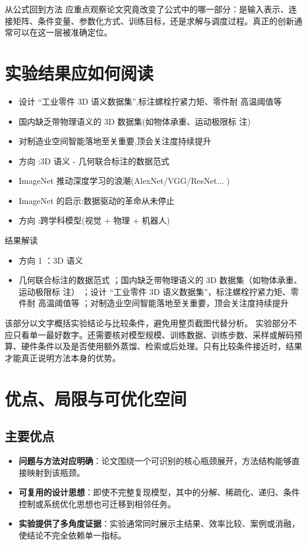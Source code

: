 \documentclass[UTF8,11pt,a4paper]{ctexart}
\newcommand{\term}[1]{\textbf{\textcolor{mainblue}{#1}}}
\begin{document}
\begin{keybox}{从公式回到方法}
应重点观察论文究竟改变了公式中的哪一部分：是输入表示、连接矩阵、条件变量、参数化方式、训练目标，还是求解与调度过程。真正的创新通常可以在这一层被准确定位。
\end{keybox}


\section{实验结果应如何阅读}
\begin{itemize}
\item 设计 “工业零件 3D 语义数据集”,标注螺栓拧紧力矩、零件耐 高温阈值等
\item 国内缺乏带物理语义的 3D 数据集(如物体承重、运动极限标 注)
\item 对制造业空间智能落地至关重要,顶会关注度持续提升
\item 方向 :3D 语义 - 几何联合标注的数据范式
\item ImageNet 推动深度学习的浪潮(AlexNet/VGG/ResNet... )
\item ImageNet 的启示:数据驱动的革命从未停止
\item 方向 :跨学科模型(视觉 + 物理 + 机器人)
\end{itemize}

\begin{notebox}{结果解读}
\begin{itemize}
\item 方向 1 ：3D 语义
\item 几何联合标注的数据范式 ；国内缺乏带物理语义的 3D 数据集（如物体承重、运动极限标 注） ；设计 “工业零件 3D 语义数据集”，标注螺栓拧紧力矩、零件耐 高温阈值等 ；对制造业空间智能落地至关重要，顶会关注度持续提升
\end{itemize}
\end{notebox}

该部分以文字概括实验结论与比较条件，避免用整页截图代替分析。
实验部分不应只看单一最好数字。还需要核对模型规模、训练数据、训练步数、采样或解码预算、硬件条件以及是否使用额外蒸馏、检索或后处理。只有比较条件接近时，结果才能真正说明方法本身的优势。

\section{优点、局限与可优化空间}
\subsection{主要优点}
\begin{itemize}
\item \term{问题与方法对应明确}：论文围绕一个可识别的核心瓶颈展开，方法结构能够直接映射到该瓶颈。
\item \term{可复用的设计思想}：即使不完整复现模型，其中的分解、稀疏化、递归、条件控制或系统优化思想也可迁移到相邻任务。
\item \term{实验提供了多角度证据}：实验通常同时展示主结果、效率比较、案例或消融，使结论不完全依赖单一指标。
\end{itemize}
\end{document}
